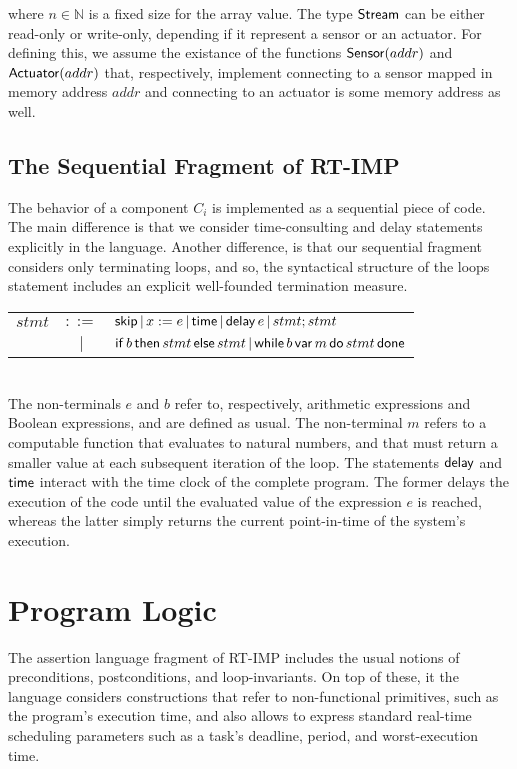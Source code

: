 \documentclass{llncs}
\begin{document}
where $n \in \mathbb{N}$ is a fixed size for the array value. The type ${\sf Stream}$ can be either read-only or write-only, depending if it represent a sensor or an actuator. For defining this, we assume the existance of the functions ${\sf Sensor}(addr)$ and ${\sf Actuator}(addr)$ that, respectively, implement connecting to a sensor mapped in memory address $addr$ and connecting to an actuator is some memory address as well.

\subsection{The Sequential Fragment of RT-IMP}

The behavior of a component $C_i$ is implemented as a sequential piece of code. The main difference is that we consider time-consulting and delay statements explicitly in the language. Another difference, is that our sequential fragment considers only terminating loops, and so, the syntactical structure of the loops statement includes an explicit well-founded termination measure.\\

\begin{tabular}{rcl}
$stmt$ & $::=$ & ${\sf skip}\,|\,x := e\,|\,{\sf time}\,|\,{\sf delay}\,e\,|\,stmt;stmt$\\
& $|$ & ${\sf if}\,b\,{\sf then}\,stmt\,{\sf else}\,stmt\,|\,{\sf while}\,b\,{\sf var}\,m\,{\sf do}\,stmt\,{\sf done}$
\end{tabular}\\

The non-terminals $e$ and $b$ refer to, respectively, arithmetic expressions and Boolean expressions, and are defined as usual. The non-terminal $m$ refers to a computable function that evaluates to natural numbers, and that must return a smaller value at each subsequent iteration of the loop. The statements ${\sf delay}$ and ${\sf time}$ interact with the time clock of the complete program. The former delays the execution of the code until the evaluated value of the expression $e$ is reached, whereas the latter simply returns the current point-in-time of the system's execution.

\section{Program Logic}

The assertion language fragment of RT-IMP includes the usual notions of preconditions, postconditions, and loop-invariants. On top of these, it the language considers constructions that refer to non-functional primitives, such as the program's execution time, and also allows to express standard real-time scheduling parameters such as a task's deadline, period, and worst-execution time.
\end{document}
